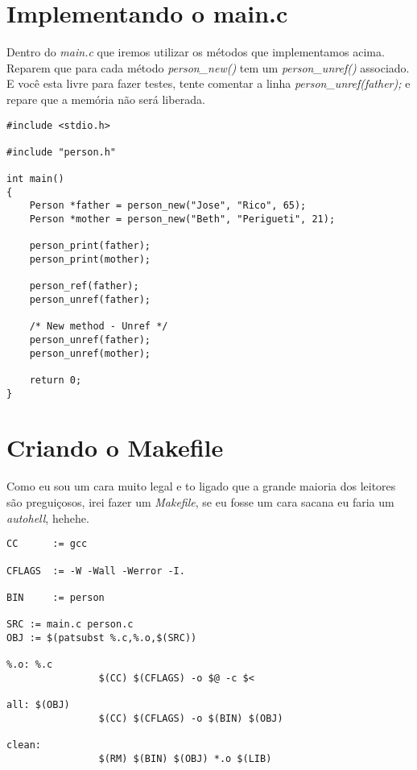 \section{Implementando o main.c}

Dentro do \textit{main.c} que iremos utilizar os métodos que implementamos acima. Reparem que para cada método \textit{person\_new()} tem um \textit{person\_unref()} associado. 
E você esta livre para fazer testes, tente comentar a linha \textit{person\_unref(father);} e repare que a memória não será liberada.

\belowcaptionskip=-10pt
\begin{lstlisting}[label=some-code,caption=main.c]
#include <stdio.h>

#include "person.h"

int main()
{
    Person *father = person_new("Jose", "Rico", 65);
    Person *mother = person_new("Beth", "Perigueti", 21);

    person_print(father);
    person_print(mother);

    person_ref(father);
    person_unref(father);

    /* New method - Unref */
    person_unref(father);
    person_unref(mother);

    return 0;
}
\end{lstlisting}


\section{Criando o Makefile}

Como eu sou um cara muito legal e to ligado que a grande maioria dos leitores são preguiçosos, irei fazer um \textit{Makefile}, se eu fosse um cara sacana eu faria um \textit{autohell}, 
hehehe.

\belowcaptionskip=-10pt
\begin{lstlisting}[label=some-code,caption=Makefile]
CC      := gcc

CFLAGS  := -W -Wall -Werror -I.

BIN     := person

SRC := main.c person.c
OBJ := $(patsubst %.c,%.o,$(SRC))

%.o: %.c
                $(CC) $(CFLAGS) -o $@ -c $<

all: $(OBJ)
                $(CC) $(CFLAGS) -o $(BIN) $(OBJ)

clean:
                $(RM) $(BIN) $(OBJ) *.o $(LIB)
\end{lstlisting}

